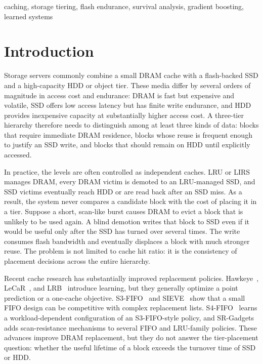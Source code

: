 \documentclass[conference]{IEEEtran}
\begin{document}
\begin{IEEEkeywords}
caching, storage tiering, flash endurance, survival analysis, gradient boosting, learned systems
\end{IEEEkeywords}

\section{Introduction}
Storage servers commonly combine a small DRAM cache with a flash-backed SSD and a high-capacity HDD or object tier. These media differ by several orders of magnitude in access cost and endurance: DRAM is fast but expensive and volatile, SSD offers low access latency but has finite write endurance, and HDD provides inexpensive capacity at substantially higher access cost. A three-tier hierarchy therefore needs to distinguish among at least three kinds of data: blocks that require immediate DRAM residence, blocks whose reuse is frequent enough to justify an SSD write, and blocks that should remain on HDD until explicitly accessed.

In practice, the levels are often controlled as independent caches. LRU or LIRS~\cite{lirs} manages DRAM, every DRAM victim is demoted to an LRU-managed SSD, and SSD victims eventually reach HDD or are read back after an SSD miss. As a result, the system never compares a candidate block with the cost of placing it in a tier. Suppose a short, scan-like burst causes DRAM to evict a block that is unlikely to be used again. A blind demotion writes that block to SSD even if it would be useful only after the SSD has turned over several times. The write consumes flash bandwidth and eventually displaces a block with much stronger reuse. The problem is not limited to cache hit ratio: it is the consistency of placement decisions across the entire hierarchy.

Recent cache research has substantially improved replacement policies. Hawkeye~\cite{hawkeye}, LeCaR~\cite{lecar}, and LRB~\cite{lrb} introduce learning, but they generally optimize a point prediction or a one-cache objective. S3-FIFO~\cite{s3fifo} and SIEVE~\cite{sieve} show that a small FIFO design can be competitive with complex replacement lists. S4-FIFO~\cite{s4fifo} learns a workload-dependent configuration of an S3-FIFO-style policy, and SR-Gadgets~\cite{srgadgets} adds scan-resistance mechanisms to several FIFO and LRU-family policies. These advances improve DRAM replacement, but they do not answer the tier-placement question: whether the useful lifetime of a block exceeds the turnover time of SSD or HDD.
\end{document}
